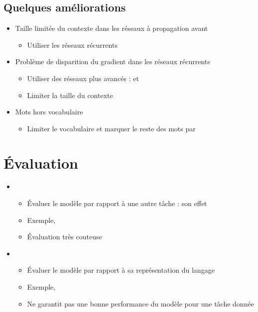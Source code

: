 \documentclass{KodeBook}
\begin{document}

\subsection{Quelques améliorations}

\begin{itemize}
	\item Taille limitée du contexte dans les réseaux à propagation avant
	\begin{itemize}
		\item Utiliser les réseaux récurrents
	\end{itemize}
	\item Problème de disparition du gradient dans les réseaux récurrents
	\begin{itemize}
		\item Utiliser des réseaux plus avancés :  et 
		\item Limiter la taille du contexte 
	\end{itemize}
	\item Mots hors vocabulaire
	\begin{itemize}
		\item Limiter le vocabulaire  et marquer le reste des mots par 
	\end{itemize}
\end{itemize}

\section{Évaluation}

	
	\begin{itemize}
		\item {}
		\begin{itemize}
			\item Évaluer le modèle par rapport à une autre tâche : son effet
			\item Exemple,  
			\item Évaluation très couteuse
		\end{itemize}
		\item {}
		\begin{itemize}
			\item Évaluer le modèle par rapport à sa représentation du langage
			\item Exemple,  
			\item Ne garantit pas une bonne performance du modèle pour une tâche donnée
		\end{itemize}
	\end{itemize}
\end{document}
